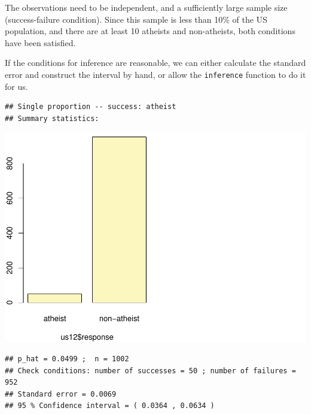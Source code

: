 \documentclass[]{article}
\newenvironment{Shaded}{\begin{snugshade}}{\end{snugshade}}
\newcommand{\KeywordTok}[1]{\textcolor[rgb]{0.13,0.29,0.53}{\textbf{#1}}}
\newcommand{\DataTypeTok}[1]{\textcolor[rgb]{0.13,0.29,0.53}{#1}}
\newcommand{\StringTok}[1]{\textcolor[rgb]{0.31,0.60,0.02}{#1}}
\newcommand{\OperatorTok}[1]{\textcolor[rgb]{0.81,0.36,0.00}{\textbf{#1}}}
\newcommand{\NormalTok}[1]{#1}
\begin{document}
The observations need to be independent, and a sufficiently large sample
size (success-failure condition). Since this sample is less than 10\% of
the US population, and there are at least 10 atheists and non-atheists,
both conditions have been satisfied.

If the conditions for inference are reasonable, we can either calculate
the standard error and construct the interval by hand, or allow the
\texttt{inference} function to do it for us.

\begin{Shaded}
\end{Shaded}

\begin{verbatim}
## Single proportion -- success: atheist 
## Summary statistics:
\end{verbatim}

\includegraphics{DATA_606_Lab_6_files/figure-latex/us-atheism-ci-1.pdf}

\begin{verbatim}
## p_hat = 0.0499 ;  n = 1002 
## Check conditions: number of successes = 50 ; number of failures = 952 
## Standard error = 0.0069 
## 95 % Confidence interval = ( 0.0364 , 0.0634 )
\end{verbatim}
\end{document}
